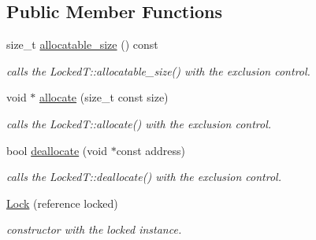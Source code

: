 \subsection*{Public Member Functions}
\begin{DoxyCompactItemize}
\item 
\hypertarget{classhryky_1_1memory_1_1heap_1_1_lock_a469a43b261f5b0dc3ce2a78c7df31e2b}{size\-\_\-t \hyperlink{classhryky_1_1memory_1_1heap_1_1_lock_a469a43b261f5b0dc3ce2a78c7df31e2b}{allocatable\-\_\-size} () const }\label{classhryky_1_1memory_1_1heap_1_1_lock_a469a43b261f5b0dc3ce2a78c7df31e2b}

\begin{DoxyCompactList}\small\item\em calls the Locked\-T\-::allocatable\-\_\-size() with the exclusion control. \end{DoxyCompactList}\item 
\hypertarget{classhryky_1_1memory_1_1heap_1_1_lock_a5c1c6735480076daff287d98769b9735}{void $\ast$ \hyperlink{classhryky_1_1memory_1_1heap_1_1_lock_a5c1c6735480076daff287d98769b9735}{allocate} (size\-\_\-t const size)}\label{classhryky_1_1memory_1_1heap_1_1_lock_a5c1c6735480076daff287d98769b9735}

\begin{DoxyCompactList}\small\item\em calls the Locked\-T\-::allocate() with the exclusion control. \end{DoxyCompactList}\item 
\hypertarget{classhryky_1_1memory_1_1heap_1_1_lock_a221ea34d7afea6045f84df3b1fa77b24}{bool \hyperlink{classhryky_1_1memory_1_1heap_1_1_lock_a221ea34d7afea6045f84df3b1fa77b24}{deallocate} (void $\ast$const address)}\label{classhryky_1_1memory_1_1heap_1_1_lock_a221ea34d7afea6045f84df3b1fa77b24}

\begin{DoxyCompactList}\small\item\em calls the Locked\-T\-::deallocate() with the exclusion control. \end{DoxyCompactList}\item 
\hypertarget{classhryky_1_1memory_1_1heap_1_1_lock_aea44137ee10e27ac7ff10e3752571117}{\hyperlink{classhryky_1_1memory_1_1heap_1_1_lock_aea44137ee10e27ac7ff10e3752571117}{Lock} (reference locked)}\label{classhryky_1_1memory_1_1heap_1_1_lock_aea44137ee10e27ac7ff10e3752571117}

\begin{DoxyCompactList}\small\item\em constructor with the locked instance. \end{DoxyCompactList}\end{DoxyCompactItemize}



